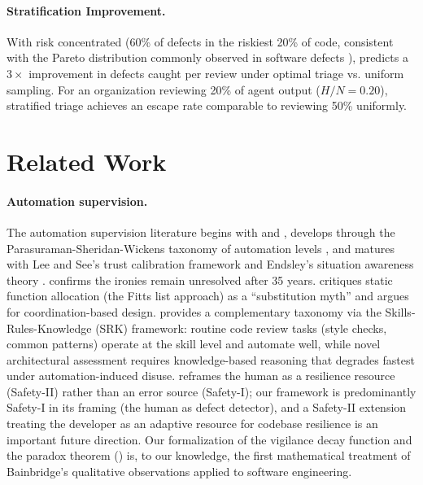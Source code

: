 \documentclass[11pt, a4paper, copyright]{googledeepmind}
\begin{document}
\paragraph{Stratification Improvement.} With risk concentrated (60\% of defects in the riskiest 20\% of code, consistent with the Pareto distribution commonly observed in software defects \citep{jones1996software}),  predicts a $3\times$ improvement in defects caught per review under optimal triage vs. uniform sampling. For an organization reviewing 20\% of agent output ($H/N = 0.20$), stratified triage achieves an escape rate comparable to reviewing 50\% uniformly.

\section{Related Work}
\label{sec:related}

\paragraph{Automation supervision.} The automation supervision literature begins with \citet{bainbridge1983ironies} and \citet{fitts1951human}, develops through the Parasuraman-Sheridan-Wickens taxonomy of automation levels \citep{parasuraman2000model}, and matures with Lee and See's trust calibration framework \citep{lee2004trust} and Endsley's situation awareness theory \citep{endsley1995toward, endsley2017here}. \citet{strauch2017ironies} confirms the ironies remain unresolved after 35 years. \citet{dekker2002maba} critiques static function allocation (the Fitts list approach) as a ``substitution myth'' and argues for coordination-based design. \citet{rasmussen1983skills} provides a complementary taxonomy via the Skills-Rules-Knowledge (SRK) framework: routine code review tasks (style checks, common patterns) operate at the skill level and automate well, while novel architectural assessment requires knowledge-based reasoning that degrades fastest under automation-induced disuse. \citet{hollnagel2014safety} reframes the human as a resilience resource (Safety-II) rather than an error source (Safety-I); our framework is predominantly Safety-I in its framing (the human as defect detector), and a Safety-II extension treating the developer as an adaptive resource for codebase resilience is an important future direction. Our formalization of the vigilance decay function and the paradox theorem () is, to our knowledge, the first mathematical treatment of Bainbridge's qualitative observations applied to software engineering.
\end{document}
